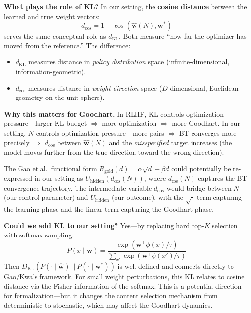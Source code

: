 \documentclass[11pt]{article}
\begin{document}
\textbf{What plays the role of KL?} In our setting, the \textbf{cosine
distance} between the learned and true weight vectors:
\begin{equation}
  d_{\cos} = 1 - \cos(\hat{\mathbf{w}}(N), \mathbf{w}^*)
\end{equation}
serves the same conceptual role as $d_{\text{KL}}$. Both measure ``how
far the optimizer has moved from the reference.'' The difference:
\begin{itemize}
  \item $d_{\text{KL}}$ measures distance in \emph{policy distribution}
    space (infinite-dimensional, information-geometric).
  \item $d_{\cos}$ measures distance in \emph{weight direction} space
    ($D$-dimensional, Euclidean geometry on the unit sphere).
\end{itemize}

\textbf{Why this matters for Goodhart.} In RLHF, KL controls
optimization pressure---larger KL budget $\Rightarrow$ more
optimization $\Rightarrow$ more Goodhart. In our setting, $N$ controls
optimization pressure---more pairs $\Rightarrow$ BT converges more
precisely $\Rightarrow$ $d_{\cos}$ between $\hat{\mathbf{w}}(N)$ and
the \emph{misspecified} target increases (the model moves further from
the true direction toward the wrong direction).

The Gao et al.\ functional form $R_{\text{gold}}(d) = \alpha\sqrt{d} -
\beta d$ could potentially be re-expressed in our setting as
$U_{\text{hidden}}(d_{\cos}(N))$, where $d_{\cos}(N)$ captures the
BT convergence trajectory. The intermediate variable $d_{\cos}$ would
bridge between $N$ (our control parameter) and
$U_{\text{hidden}}$ (our outcome), with the $\sqrt{\cdot}$ term
capturing the learning phase and the linear term capturing the
Goodhart phase.

\textbf{Could we add KL to our setting?} Yes---by replacing hard
top-$K$ selection with softmax sampling:
\begin{equation}
  P(x \mid \mathbf{w}) = \frac{\exp(\mathbf{w}^\top \phi(x) / \tau)}
    {\sum_{x'} \exp(\mathbf{w}^\top \phi(x') / \tau)}
\end{equation}
Then $D_{\text{KL}}(P(\cdot \mid \hat{\mathbf{w}}) \| P(\cdot \mid
\mathbf{w}^*))$ is well-defined and connects directly to Gao/Kwa's
framework. For small weight perturbations, this KL relates to cosine
distance via the Fisher information of the softmax. This is a potential
direction for formalization---but it changes the content selection
mechanism from deterministic to stochastic, which may affect the
Goodhart dynamics.
\end{document}
